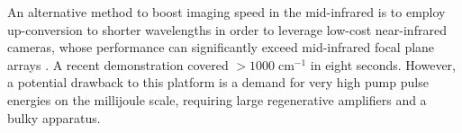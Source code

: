 \documentclass{optica-article}
\begin{document}

An alternative method to boost imaging speed in the mid-infrared is to employ up-conversion to shorter wavelengths in order to leverage low-cost near-infrared cameras, whose performance can significantly exceed mid-infrared focal plane arrays \cite{junaidVideorateMidinfraredHyperspectral2019,knezInfraredChemicalImaging2020,potmaRapidChemicallySelective2021}. A recent demonstration covered \mbox{$>$$1000 \; \mathrm{cm^{-1}}$} \cite{zhaoHighspeedScanlessEntire2023} in eight seconds. 
% 
% 
% 
However, a potential drawback to this platform is a demand for very high pump pulse energies on the millijoule scale, requiring large regenerative amplifiers and a bulky apparatus.




\end{document}
